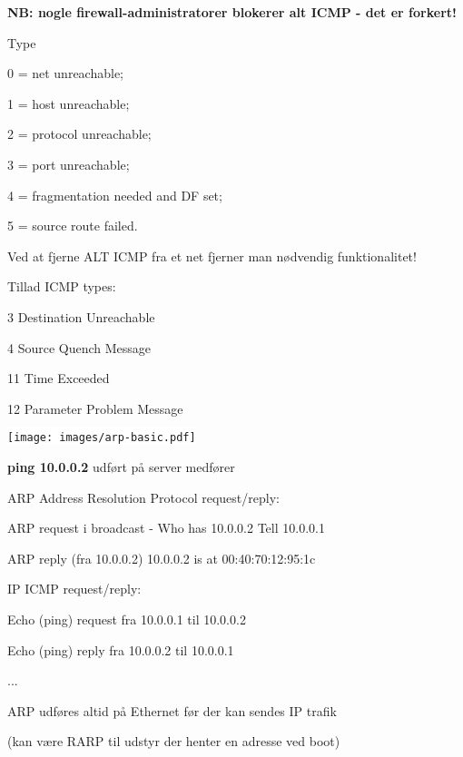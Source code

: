 \documentclass[Screen16to9,17pt]{foils}
\begin{document}
\centerline{\bf NB: nogle firewall-administratorer blokerer alt ICMP - det er forkert!}


\begin{list1}
\item Type
\begin{list2}
\item 0 = net unreachable;
\item 1 = host unreachable;
\item 2 = protocol unreachable;
\item 3 = port unreachable;
\item 4 = fragmentation needed and DF set;
\item 5 = source route failed.
\end{list2}
\item Ved at fjerne ALT ICMP fra et net fjerner man nødvendig funktionalitet!
\item Tillad ICMP types:
\begin{list2}
\item 3 Destination Unreachable
\item 4 Source Quench Message
\item 11 Time Exceeded
\item 12 Parameter Problem Message
\end{list2}
\end{list1}


\begin{center}
\colorbox{white}{\texttt{[image: images/arp-basic.pdf]}}
\end{center}


\begin{list1}
\item {\bfseries ping 10.0.0.2} udført på server medfører
\item ARP Address Resolution Protocol request/reply:
  \begin{list2}
  \item ARP request i broadcast - Who has 10.0.0.2 Tell 10.0.0.1
  \item ARP reply (fra 10.0.0.2) 10.0.0.2 is at 00:40:70:12:95:1c
  \end{list2}
\item IP ICMP request/reply:
  \begin{list2}
    \item Echo (ping) request fra 10.0.0.1 til 10.0.0.2
\item Echo (ping) reply fra 10.0.0.2 til 10.0.0.1
\item ...
  \end{list2}
\item ARP udføres altid på Ethernet før der kan sendes IP trafik
\item (kan være RARP til udstyr der henter en adresse ved boot)
\end{list1}
\end{document}
